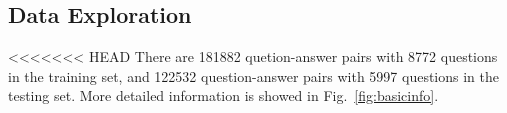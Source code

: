 \documentclass{llncs}
\begin{document}
\subsection{Data Exploration}
\label{sec:exploration}

<<<<<<< HEAD
There are 181882 quetion-answer pairs with 8772 questions in the training set, and 122532 question-answer pairs with 5997 questions in the testing set. More detailed information is showed in  Fig.~\ref{fig:basicinfo}.
\end{document}
